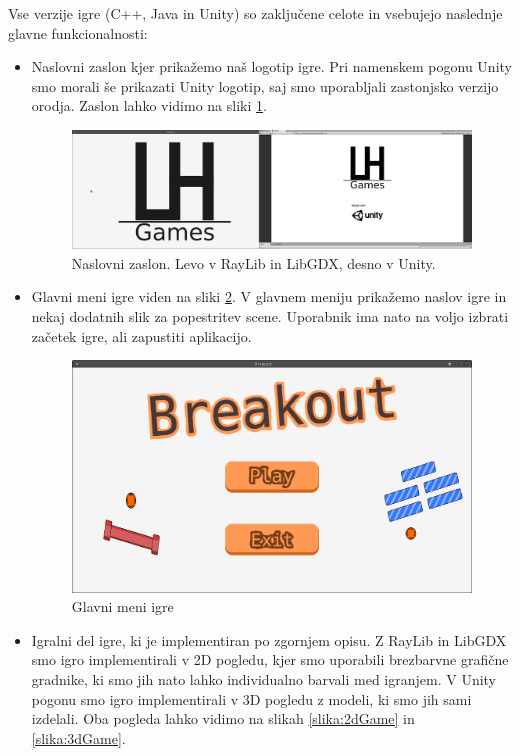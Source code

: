 \documentclass[12pt,a4paper,twoside]{book}
\begin{document}
Vse verzije igre (C++, Java in Unity) so zaključene celote in vsebujejo naslednje glavne funkcionalnosti:
\begin{itemize}
\item Naslovni zaslon kjer prikažemo naš logotip igre. Pri namenskem pogonu Unity smo morali še prikazati Unity logotip, saj smo uporabljali zastonjsko verzijo orodja. Zaslon lahko vidimo na sliki \ref{slika:naslovniZaslon}.
\begin{figure}[h]
	\centering
	\includegraphics[width=14cm]{titleScreen}
	\caption{Naslovni zaslon. Levo v RayLib in LibGDX, desno v Unity.}
	\label{slika:naslovniZaslon}
\end{figure}
\item Glavni meni igre viden na sliki \ref{slika:mainMenu}. V glavnem meniju prikažemo naslov igre in nekaj dodatnih slik za popestritev scene. Uporabnik ima nato na voljo izbrati začetek igre, ali zapustiti aplikacijo.
\begin{figure}[h]
	\centering
	\includegraphics[width=14cm]{mainMenu}
	\caption{Glavni meni igre}
	\label{slika:mainMenu}
\end{figure}
\item Igralni del igre, ki je implementiran po zgornjem opisu. Z RayLib in LibGDX smo igro implementirali v 2D pogledu, kjer smo uporabili brezbarvne grafične gradnike, ki smo jih nato lahko individualno barvali med igranjem. V Unity pogonu smo igro implementirali v 3D pogledu z modeli, ki smo jih sami izdelali. Oba pogleda lahko vidimo na slikah \ref{slika:2dGame} in \ref{slika:3dGame}.

\end{itemize}
\end{document}
